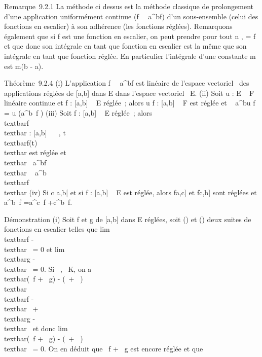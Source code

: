 Remarque~9.2.1 La méthode ci dessus est la méthode classique de
prolongement d'une application uniformément continue
(f\mapsto~\int ~
a^bf) d'un sous-ensemble (celui des fonctions en
escalier) à son adhérence (les fonctions réglées). Remarquons également
que si f est une fonction en escalier, on peut prendre pour tout n ,
\phin = f et que donc son intégrale en tant que fonction en
escalier est la même que son intégrale en tant que fonction réglée. En
particulier l'intégrale d'une constante m est m(b - a).

Théorème~9.2.4 (i) L'application
f\mapsto~\int ~
a^bf est linéaire de l'espace vectoriel ~des applications
réglées de {[}a,b{]} dans E dans l'espace vectoriel ~E. (ii) Soit u : E
\rightarrow~ F linéaire continue et f : {[}a,b{]} \rightarrow~ E réglée~; alors u \cdot f :
{[}a,b{]} \rightarrow~ F est réglée et \int ~
a^bu \cdot f = u\left
(\int  a^b~f\right
) (iii) Soit f : {[}a,b{]} \rightarrow~ E réglée~; alors
\\textbar{}f\\textbar{} : {[}a,b{]} \rightarrow~ ~,
t\mapsto~\\textbar{}f(t)\\textbar{}
est réglée et \\textbar{}\int ~
a^bf\\textbar{}
\leq\int ~
a^b\\textbar{}f\\textbar{}
(iv) Si c \in{]}a,b{[} et si f : {[}a,b{]} \rightarrow~ E est réglée, alors
f\textbar{}{[}a,c{]} et
f\textbar{}{[}c,b{]} sont réglées et
\int  a^b~f
=\int  a^c~f
+\int  c^b~f.

Démonstration (i) Soit f et g de {[}a,b{]} dans E réglées, soit
(\phin) et (\psin) deux suites de fonctions en escalier
telles que lim~\\textbar{}f -
\phin\\textbar{}\infty~ = 0 et
lim~\\textbar{}g -
\psin\\textbar{}\infty~ = 0. Si \alpha~,\beta~ \in K, on a
\\textbar{}(\alpha~f + \beta~g) - (\alpha~\phin +
\beta~\psin)\\textbar{}\infty~
\leq\textbar{}\alpha~\textbar{}\\textbar{}f -
\phin\\textbar{}\infty~ +
\textbar{}\beta~\textbar{}\\textbar{}g -
\psin\\textbar{}\infty~ et donc
lim~\\textbar{}(\alpha~f + \beta~g) -
(\alpha~\phin + \beta~\psin)\\textbar{}\infty~ = 0. On en
déduit que \alpha~f + \beta~g est encore réglée et que

